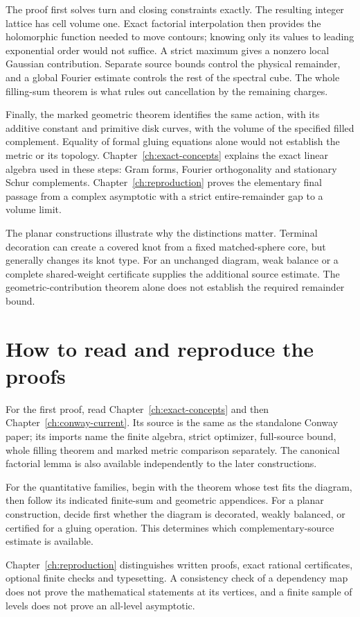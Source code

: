 The proof first solves turn and closing constraints exactly.
The resulting integer lattice has cell volume one. Exact
factorial interpolation then provides the holomorphic function
needed to move contours; knowing only its values to leading
exponential order would not suffice. A strict maximum gives a
nonzero local Gaussian contribution. Separate source bounds
control the physical remainder, and a global Fourier estimate
controls the rest of the spectral cube. The whole filling-sum
theorem is what rules out cancellation by the remaining charges.

Finally, the marked geometric theorem identifies the same action,
with its additive constant and primitive disk curves, with the
volume of the specified filled complement. Equality of formal
gluing equations alone would not establish the metric or its
topology. Chapter~\ref{ch:exact-concepts} explains the exact linear
algebra used in these steps: Gram forms, Fourier orthogonality
and stationary Schur complements. Chapter~\ref{ch:reproduction}
proves the elementary final passage from a complex asymptotic
with a strict entire-remainder gap to a volume limit.

The planar constructions illustrate why the distinctions matter.
Terminal decoration can create a covered knot from a fixed
matched-sphere core, but generally changes its knot type.
For an unchanged diagram, weak balance or a complete shared-weight
certificate supplies the additional source estimate. The
geometric-contribution theorem alone does not establish the required remainder bound.

\section{How to read and reproduce the proofs}

For the first proof, read Chapter~\ref{ch:exact-concepts} and then
Chapter~\ref{ch:conway-current}. Its source is the same as the
standalone Conway paper; its imports name the finite algebra,
strict optimizer, full-source bound, whole filling theorem and
marked metric comparison separately. The canonical factorial
lemma is also available independently to the later constructions.

For the quantitative families, begin with the theorem whose test
fits the diagram, then follow its indicated finite-sum and geometric
appendices. For a planar construction, decide first whether the
diagram is decorated, weakly balanced, or certified for a gluing
operation. This determines which complementary-source estimate
is available.

Chapter~\ref{ch:reproduction} distinguishes written proofs, exact
rational certificates, optional finite checks and typesetting.
A consistency check of a dependency map does not prove the
mathematical statements at its vertices, and a finite sample of
levels does not prove an all-level asymptotic.
